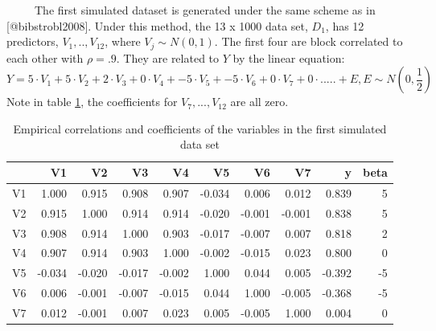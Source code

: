\documentclass[12pt,twoside]{reedthesis}
\begin{document}
  ~~~~~The first simulated dataset is generated under the same scheme as
  in {[}@bibstrobl2008{]}. Under this method, the 13 x 1000 data set,
  \(D_1\), has 12 predictors, \(V_1,..,V_{12}\), where
  \(V_j \sim N(0,1)\). The first four are block correlated to each other
  with \(\rho = .9\). They are related to \(Y\) by the linear equation:
  \[Y = 5 \cdot V_1 + 5 \cdot V_2 + 2 \cdot V_3 + 0 \cdot V_4 + -5 \cdot V_5 + -5\cdot V_6 + 0\cdot V_7 + 0 \cdot ..... + E, E \sim N(0,\frac 1 2 )\]
  Note in table \ref{tab:tabcorSim1}, the coefficients for
  \(V_7,...,V_{12}\) are all zero.
  
  \begin{table}
  
  \caption{\label{tab:unnamed-chunk-9}\label{tab:tabcorSim1}Empirical correlations and coefficients of the variables in the first simulated data set}
  \centering
  \begin{tabular}[t]{l|r|r|r|r|r|r|r|r|r}
  \hline
    & V1 & V2 & V3 & V4 & V5 & V6 & V7 & y & beta\\
  \hline
  V1 & 1.000 & 0.915 & 0.908 & 0.907 & -0.034 & 0.006 & 0.012 & 0.839 & 5\\
  \hline
  V2 & 0.915 & 1.000 & 0.914 & 0.914 & -0.020 & -0.001 & -0.001 & 0.838 & 5\\
  \hline
  V3 & 0.908 & 0.914 & 1.000 & 0.903 & -0.017 & -0.007 & 0.007 & 0.818 & 2\\
  \hline
  V4 & 0.907 & 0.914 & 0.903 & 1.000 & -0.002 & -0.015 & 0.023 & 0.800 & 0\\
  \hline
  V5 & -0.034 & -0.020 & -0.017 & -0.002 & 1.000 & 0.044 & 0.005 & -0.392 & -5\\
  \hline
  V6 & 0.006 & -0.001 & -0.007 & -0.015 & 0.044 & 1.000 & -0.005 & -0.368 & -5\\
  \hline
  V7 & 0.012 & -0.001 & 0.007 & 0.023 & 0.005 & -0.005 & 1.000 & 0.004 & 0\\
  \hline
  \end{tabular}
  \end{table}
  
\end{document}
